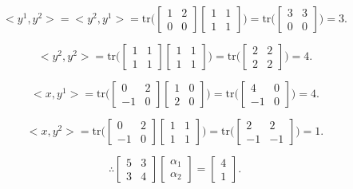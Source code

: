 \documentclass[letterpaper]{article}
\begin{document}
$$<y^1, y^2> = <y^2, y^1> = \mathrm{tr}\bigg(\left[\begin{array}{cc}1 & 2\\ 0 & 0\end{array}\right]\left[\begin{array}{cc}1 & 1\\ 1 & 1\end{array}\right]\bigg) = \mathrm{tr}\bigg(\left[\begin{array}{cc}3 & 3\\ 0 & 0\end{array}\right]\bigg) = 3.$$

$$<y^2, y^2> = \mathrm{tr}\bigg(\left[\begin{array}{cc}1 & 1\\ 1 & 1\end{array}\right]\left[\begin{array}{cc}1 & 1\\ 1 & 1\end{array}\right]\bigg) = \mathrm{tr}\bigg(\left[\begin{array}{cc}2 & 2\\ 2 & 2\end{array}\right]\bigg) = 4.$$

$$<x, y^1> = \mathrm{tr}\bigg(\left[\begin{array}{cc}0 & 2\\ -1 & 0\end{array}\right]\left[\begin{array}{cc}1 & 0\\ 2 & 0\end{array}\right]\bigg) = \mathrm{tr}\bigg(\left[\begin{array}{cc}4 & 0\\ -1 & 0\end{array}\right]\bigg) = 4.$$

$$<x, y^2> = \mathrm{tr}\bigg(\left[\begin{array}{cc}0 & 2\\ -1 & 0\end{array}\right]\left[\begin{array}{cc}1 & 1\\ 1 & 1\end{array}\right]\bigg) = \mathrm{tr}\bigg(\left[\begin{array}{cc}2 & 2\\ -1 & -1\end{array}\right]\bigg) = 1.$$

$$\therefore \left[\begin{array}{cc}5 & 3\\ 3 & 4\end{array}\right]\begin{bmatrix} \alpha_1 \\ \alpha_2 \end{bmatrix} = \begin{bmatrix} 4 \\ 1\end{bmatrix}.$$
\end{document}
